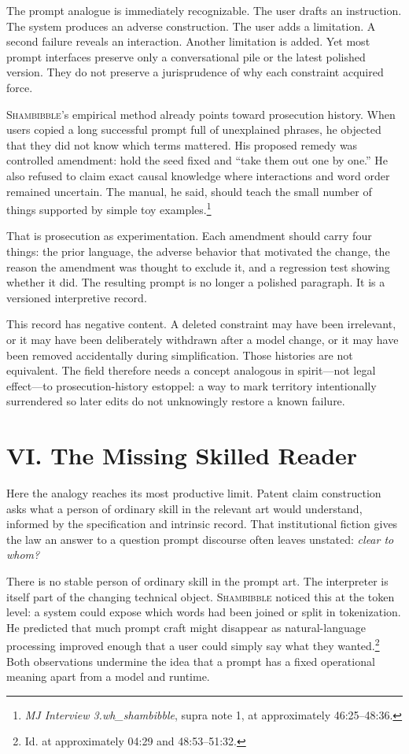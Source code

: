\documentclass[11pt]{article}
\newcommand{\sham}{\textsc{Shambibble}\xspace}
\begin{document}
The prompt analogue is immediately recognizable. The user drafts an instruction. The system produces an adverse construction. The user adds a limitation. A second failure reveals an interaction. Another limitation is added. Yet most prompt interfaces preserve only a conversational pile or the latest polished version. They do not preserve a jurisprudence of why each constraint acquired force.

\sham's empirical method already points toward prosecution history. When users copied a long successful prompt full of unexplained phrases, he objected that they did not know which terms mattered. His proposed remedy was controlled amendment: hold the seed fixed and ``take them out one by one.'' He also refused to claim exact causal knowledge where interactions and word order remained uncertain. The manual, he said, should teach the small number of things supported by simple toy examples.\footnote{\emph{MJ Interview 3.wh\_shambibble}, supra note 1, at approximately 46:25--48:36.}

That is prosecution as experimentation. Each amendment should carry four things: the prior language, the adverse behavior that motivated the change, the reason the amendment was thought to exclude it, and a regression test showing whether it did. The resulting prompt is no longer a polished paragraph. It is a versioned interpretive record.

This record has negative content. A deleted constraint may have been irrelevant, or it may have been deliberately withdrawn after a model change, or it may have been removed accidentally during simplification. Those histories are not equivalent. The field therefore needs a concept analogous in spirit---not legal effect---to prosecution-history estoppel: a way to mark territory intentionally surrendered so later edits do not unknowingly restore a known failure.

\section*{VI. The Missing Skilled Reader}
Here the analogy reaches its most productive limit. Patent claim construction asks what a person of ordinary skill in the relevant art would understand, informed by the specification and intrinsic record. That institutional fiction gives the law an answer to a question prompt discourse often leaves unstated: \emph{clear to whom?}

There is no stable person of ordinary skill in the prompt art. The interpreter is itself part of the changing technical object. \sham noticed this at the token level: a system could expose which words had been joined or split in tokenization. He predicted that much prompt craft might disappear as natural-language processing improved enough that a user could simply say what they wanted.\footnote{Id. at approximately 04:29 and 48:53--51:32.} Both observations undermine the idea that a prompt has a fixed operational meaning apart from a model and runtime.
\end{document}
